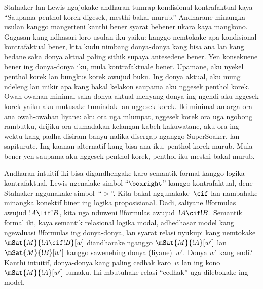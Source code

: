 \documentclass[../../../include/open-logic-section]{subfiles}
\begin{document}


Stalnaker lan Lewis ngajokake andharan tumrap kondisional
kontrafaktual kaya ``Saupama penthol korek digesek, mesthi bakal
murub.'' Andharane minangka usulan kanggo mangerteni kanthi
bener syarat bebener ukara kaya mangkono. Gagasan kang ndhasari
loro usulan iku yaiku: kanggo nemtokake apa kondisional
kontrafaktual bener, kita kudu nimbang donya-donya kang bisa ana
lan kang bedane saka donya aktual paling sithik supaya
antesedene bener. Yen konsekuene bener ing donya-donya iku,
mula kontrafaktuale bener. Upamane, aku nyekel penthol korek
lan bungkus korek awujud buku. Ing donya aktual, aku mung
ndeleng lan mikir apa kang bakal kelakon saupama aku nggesek
penthol korek. Owah-owahan minimal saka donya aktual menyang
donya ing ngendi aku nggesek korek yaiku aku mutusake tumindak
lan nggesek korek. Iki minimal amarga ora ana owah-owahan
liyane: aku ora uga mlumpat, nggesek korek ora uga ngobong
rambutku, drijiku ora dumadakan kelangan kabeh kakuwatane,
aku ora ing wektu kang padha disiram banyu nalika disergap
nganggo SuperSoaker, lan sapiturute. Ing kaanan alternatif kang bisa ana
iku, penthol korek murub. Mula bener yen saupama aku nggesek
penthol korek, penthol iku mesthi bakal murub.

Andharan intuitif iki bisa digandhengake karo semantik formal
kanggo logika kontrafaktual. Lewis ngenalake simbol ``$\boxright$''
kanggo kontrafaktual, dene Stalnaker nggunakake simbol~``$>$''.
Kita bakal nggunakake~$\cif$ lan nambahake minangka konektif
biner ing logika proposisional. Dadi, saliyane !!{formula}s
awujud $!A \lif !B$, kita uga nduweni !!{formula}s awujud~$!A \cif !B$.
Semantik formal iki, kaya semantik relasional logika modal,
adhedhasar model kang ngevaluasi !!{formula}s ing donya-donya,
lan syarat relasi nyukupi kang nemtokake $\mSat{M}{!A \cif !B}[w]$
diandharake nganggo $\mSat{M}{!A}[w']$ lan $\mSat{M}{!B}[w']$
kanggo sawenehing donya (liyane)~$w'$. Donya $w'$ kang endi?
Kanthi intuitif, donya-donya kang paling cedhak karo~$w$ lan ing
kono $\mSat{M}{!A}[w']$ lumaku. Iki mbutuhake relasi
``cedhak'' uga dilebokake ing model.
\end{document}
